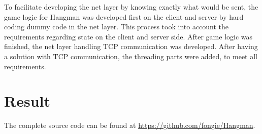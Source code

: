 \documentclass[a4paper]{scrartcl}
\begin{document}
To facilitate developing the net layer by knowing exactly what would be sent, the game logic for Hangman was developed first on the client and server by hard coding dummy code in the net layer. This process took into account the requirements regarding state on the client and server side. After game logic was finished, the net layer handling TCP communication was developed. After having a solution with TCP communication, the threading parts were added, to meet all requirements.

\section{Result}

\noindent The complete source code can be found at \href{https://github.com/fongie/Hangman}{https://github.com/fongie/Hangman}.
\end{document}
